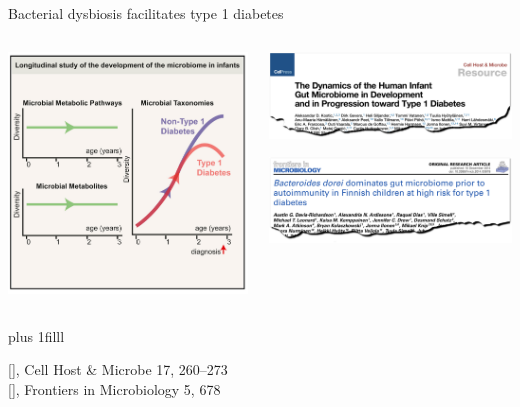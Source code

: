 \documentclass[10pt]{beamer}
\newcommand{\credit}[1]{{\vskip0pt plus 1filll \par \raggedleft \scriptsize \mdseries \color{mDarkBrown} #1 \par}}
\newcommand{\citeme}[1]{{\xspace\color{scAqua} \scriptsize [\cite{#1}]}}
\begin{document}
\begin{frame}{Bacterial dysbiosis facilitates type 1 diabetes}
	\vspace{1cm}
	\begin{columns}
		\begin{column}{0.4\textwidth}
			\includegraphics[width=\textwidth]{./figures/diabetes3.png}
		\end{column}
		\begin{column}{0.7\textwidth}
			\begin{center}
				\includegraphics[width=\textwidth]{./figures/diabetes1.png}\par
				\includegraphics[width=\textwidth]{./figures/diabetes2.png}
			\end{center}
		\end{column}
	\end{columns}
	\credit{\citeme{Kostic2015}, Cell Host \& Microbe 17, 260–273 \\
	\citeme{DavisRichardson2014}, Frontiers in Microbiology 5, 678}
\end{frame}
\end{document}
